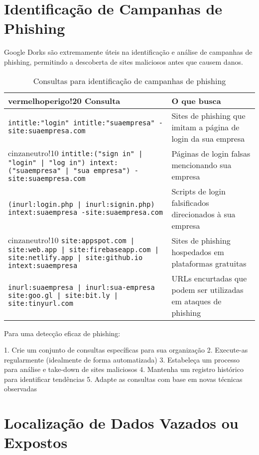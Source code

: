 \documentclass[12pt,a4paper]{book}
\begin{document}
\section{Identificação de Campanhas de Phishing}

Google Dorks são extremamente úteis na identificação e análise de campanhas de phishing, permitindo a descoberta de sites maliciosos antes que causem danos.

\begin{table}[h]
\centering
\begin{tabular}{|p{8cm}|p{7cm}|}
\hline
{vermelhoperigo!20} \textbf{Consulta} & \textbf{O que busca} \\
\hline
\texttt{intitle:"login" intitle:"suaempresa" -site:suaempresa.com} & Sites de phishing que imitam a página de login da sua empresa \\
\hline
{cinzaneutro!10} \texttt{intitle:("sign in" | "login" | "log in") intext:("suaempresa" | "sua empresa") -site:suaempresa.com} & Páginas de login falsas mencionando sua empresa \\
\hline
\texttt{(inurl:login.php | inurl:signin.php) intext:suaempresa -site:suaempresa.com} & Scripts de login falsificados direcionados à sua empresa \\
\hline
{cinzaneutro!10} \texttt{site:appspot.com | site:web.app | site:firebaseapp.com | site:netlify.app | site:github.io intext:suaempresa} & Sites de phishing hospedados em plataformas gratuitas \\
\hline
\texttt{inurl:suaempresa | inurl:sua-empresa site:goo.gl | site:bit.ly | site:tinyurl.com} & URLs encurtadas que podem ser utilizadas em ataques de phishing \\
\hline
\end{tabular}
\caption{Consultas para identificação de campanhas de phishing}
\end{table}

\begin{tipbox}
Para uma detecção eficaz de phishing:

1. Crie um conjunto de consultas específicas para sua organização
2. Execute-as regularmente (idealmente de forma automatizada)
3. Estabeleça um processo para análise e take-down de sites maliciosos
4. Mantenha um registro histórico para identificar tendências
5. Adapte as consultas com base em novas técnicas observadas
\end{tipbox}

\section{Localização de Dados Vazados ou Expostos}
\end{document}
